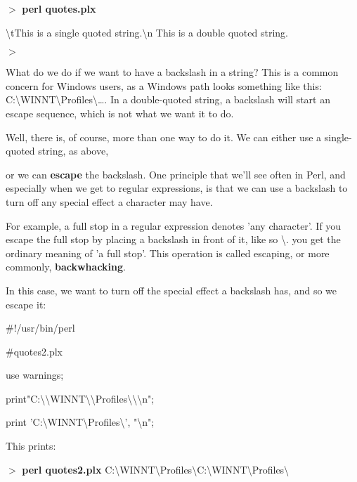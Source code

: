 \documentclass[a4paper,11pt]{book}
\begin{document}
\noindent 

\noindent $>$ \textbf{perl quotes.plx}

\noindent \textbackslash tThis is a single quoted string.\textbackslash n This is a double quoted string.

\noindent $>$

\noindent 

\noindent What do we do if we want to have a backslash in a string? This is a common concern for Windows users, as a Windows path looks something like this: C:\textbackslash WINNT\textbackslash Profiles\textbackslash \dots . In a double-quoted string, a backslash will start an escape sequence, which is not what we want it to do.

\noindent 

\noindent Well, there is, of course, more than one way to do it. We can either use a single-quoted string, as above,

\noindent or we can \textbf{escape }the backslash. One principle that we'll see often in Perl, and especially when we get to regular expressions, is that we can use a backslash to turn off any special effect a character may have.

\noindent For example, a full stop in a regular expression denotes 'any character'. If you escape the full stop by placing a backslash in front of it, like so \textbackslash . you get the ordinary meaning of 'a full stop'. This operation is called escaping, or more commonly, \textbf{backwhacking}.

\noindent 

\noindent In this case, we want to turn off the special effect a backslash has, and so we escape it:

\noindent 

\noindent \#!/usr/bin/perl

\noindent \#quotes2.plx

\noindent use warnings;

\noindent print"C:\textbackslash \textbackslash WINNT\textbackslash \textbackslash Profiles\textbackslash \textbackslash \textbackslash n";

\noindent print 'C:\textbackslash WINNT\textbackslash Profiles\textbackslash  ', "\textbackslash n";

\noindent 

\noindent This prints:

\noindent 

\noindent $>$ \textbf{perl quotes2.plx }C:\textbackslash WINNT\textbackslash Profiles\textbackslash  C:\textbackslash WINNT\textbackslash Profiles\textbackslash 
\end{document}
